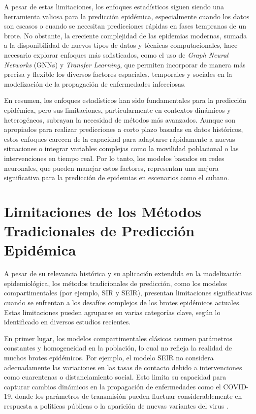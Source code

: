 A pesar de estas limitaciones, los enfoques estadísticos siguen siendo una herramienta valiosa para la predicción epidémica, especialmente cuando los datos son escasos o cuando se necesitan predicciones rápidas en fases tempranas de un brote. No obstante, la creciente complejidad de las epidemias modernas, sumada a la disponibilidad de nuevos tipos de datos y técnicas computacionales, hace necesario explorar enfoques más sofisticados, como el uso de \textit{Graph Neural Networks} (GNNs) y \textit{Transfer Learning}, que permiten incorporar de manera más precisa y flexible los diversos factores espaciales, temporales y sociales en la modelización de la propagación de enfermedades infecciosas.

En resumen, los enfoques estadísticos han sido fundamentales para la predicción epidémica, pero sus limitaciones, particularmente en contextos dinámicos y heterogéneos, subrayan la necesidad de métodos más avanzados. Aunque son apropiados para realizar predicciones a corto plazo basadas en datos históricos, estos enfoques carecen de la capacidad para adaptarse rápidamente a nuevas situaciones o integrar variables complejas como la movilidad poblacional o las intervenciones en tiempo real. Por lo tanto, los modelos basados en redes neuronales, que pueden manejar estos factores, representan una mejora significativa para la predicción de epidemias en escenarios como el cubano.

\section{Limitaciones de los Métodos Tradicionales de Predicción Epidémica}

A pesar de su relevancia histórica y su aplicación extendida en la modelización epidemiológica, los métodos tradicionales de predicción, como los modelos compartimentales (por ejemplo, SIR y SEIR), presentan limitaciones significativas cuando se enfrentan a los desafíos complejos de los brotes epidémicos actuales. Estas limitaciones pueden agruparse en varias categorías clave, según lo identificado en diversos estudios recientes.

En primer lugar, los modelos compartimentales clásicos asumen parámetros constantes y homogeneidad en la población, lo cual no refleja la realidad de muchos brotes epidémicos. Por ejemplo, el modelo SEIR no considera adecuadamente las variaciones en las tasas de contacto debido a intervenciones como cuarentenas o distanciamiento social. Esto limita su capacidad para capturar cambios dinámicos en la propagación de enfermedades como el COVID-19, donde los parámetros de transmisión pueden fluctuar considerablemente en respuesta a políticas públicas o la aparición de nuevas variantes del virus \cite{AutoSEIR2020, Baccega2024}.

